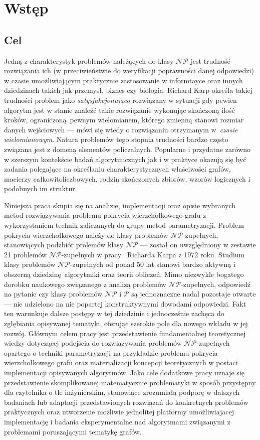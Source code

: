 \chapter{Wstęp}\label{Chapter_Introduction}
\section{Cel}\label{Section_Aim}
\par{
  Jedną z charakterystyk problemów należących do klasy $\mathcal{NP}$ jest trudność rozwiązania ich (w przeciwieństwie do weryfikacji poprawności danej odpowiedzi) w czasie umożliwiającym praktycznie zastosowanie w informtayce oraz innych dziedzinach takich jak przemysł, biznes czy biologia.
  Richard Karp określa takiej trudności problem jako \emph{satysfakcjonująco} rozwiązany w sytuacji gdy pewien algorytm jest w stanie znaleźć takie rozwiązanie wykonując skończoną ilość kroków, ograniczoną pewnym wielomianem, którego zmienną stanowi rozmiar danych wejściowych --- mówi się wtedy o rozwiązaniu otrzymanym w~\emph{czasie wielomianowym}.
  Natura problemów tego stopnia trudności bardzo często związana jest z domeną elementów policzalnych.
  Popularne i przydatne zarówno w szerszym kontekście badań algorytmicznych jak i w praktyce okazują się być zadania polegające na określaniu charakterystycznych właściwości grafów, macierzy całkowitoliczbowych, rodzin skończonych zbiorów, wzorów logicznych i podobnych im struktur.
}
\par{
  Niniejsza praca skupia się na analizie, implementacji oraz opisie wybranych metod rozwiązywania problemu pokrycia wierzchołkowego grafu z wykorzystaniem technik zaliczanych do grupy metod parametryzacji.
  Problem pokrycia wierzchołkowego należy do klasy problemów $\mathcal{NP}$-zupełnych, stanowiących podzbiór prolemów klasy $\mathcal{NP}$ --- został on uwzględniony w zestawie 21 problemów $\mathcal{NP}$-zupełnych w pracy~\cite{DBLP:Karp10} Richarda Karpa z 1972 roku.
  Studium klasy problemów $\mathcal{NP}$-zupełnych od ponad 50 lat stanowi bardzo aktywną i obszerną dziedzinę algorytmiki oraz teorii obliczeń.
  Mimo niezwykle bogatego dorobku naukowego związanego z analizą problemów $\mathcal{NP}$-zupełnych, odpowiedź na pytanie czy klasy problemów $\mathcal{NP}$ i $\mathcal{P}$ są jednoznaczne nadal pozostaje otwarte --- nie udzielono na nie popartej konstruktywnymi dowodami odpowiedzi.
  Fakt ten warunkuje dalsze postępy w tej dziedzinie i jednocześnie zachęca do zgłębiania opisywanej tematyki, oferując szerokie pole dla nowego wkładu w jej rozwój.
  Głównym celem pracy jest przedstawienie fundamentalnej teoretycznej wiedzy dotyczącej podejścia do rozwiązywania problemów $\mathcal{NP}$-zupełnych opartego o techniki parametryzacji na przykładzie problemu pokrycia wierzchołkowego grafu oraz materializacji koncepcji teoretycznych w postaci implementacji opisywanych algorytmów.
  Jako cele dodatkowe pracy uznaje się przedstawienie skomplikowanej matematycznie problematyki w sposób przystępny dla czytelnika o tle inżynierskim, stanowiące zrozumiałą podporę w dalszych badaniach lub adaptacji przedstawionych rozwiązań do konkretnych problemów praktycznych oraz utworzenie możliwie jednolitej platformy umożliwiajacej implementację i badania eksperymentalne nad algorytmami związanymi z problemami poruszającymi tematykę grafów.
}
